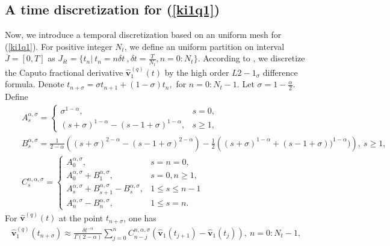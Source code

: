 \documentclass[9pt]{article}
\numberwithin{equation}{section}
\begin{document}
 \subsection{ A time discretization for (\ref{ki1q1}) } Now, we introduce a temporal discretization based on an uniform mesh for (\ref{ki1q1}). For positive integer $N_t$, we define an uniform partition on interval $\overline{J}=[0,T]$ as
$J_{\delta t} =\{ t_{n}|~ t_{n}=n \delta t~,\delta t= \frac{T}{N_t} ,n=0:N_t\}$. According to \cite{alikhonov}, we discretize the Caputo fractional derivative $  \widehat{\textbf{v}}_{1}^{(q)}(t)$ by the high order $L2-1_{\sigma}$ difference formula. Denote $t_{n+\sigma}=\sigma t_{n+1}+(1-\sigma)t_n,$ for $n=0:N_t-1$. 
Let $\sigma=1-\frac{\alpha}{2}$. Define
 \begin{eqnarray*}
 &&A_{s}^{\alpha,\sigma}=\left\{
                         \begin{array}{ll}
                           \sigma^{1-\alpha}, & s=0,\\
                           (s+\sigma)^{1-\alpha}-(s-1+\sigma)^{1-\alpha}, & s\geq1,
                         \end{array}
                       \right.\\
&&B_{s}^{\alpha,\sigma}=\frac{1}{2-\alpha}\left((s+\sigma)^{2-\alpha}-(s-1+\sigma)^{2-\alpha}\right)-\frac{1}{2}\left((s+\sigma)^{1-\alpha}+(s-1+\sigma))^{1-\alpha})\right),~s\geq1,\\
&&C_{s}^{n,\alpha,\sigma}=\left\{
                            \begin{array}{ll}
                              A_{0}^{\alpha,\sigma}, & s=n=0, \\
                               A_{0}^{\alpha,\sigma}+ B_{1}^{\alpha,\sigma}, & s=0,n\geq1, \\
                               A_{s}^{\alpha,\sigma}+ B_{s+1}^{\alpha,\sigma}-B_{s}^{\alpha,\sigma}, & 1 \leq s\leq n-1\\
                              A_{n}^{\alpha,\sigma}-B_{n}^{\alpha,\sigma}, & 1\leq s=n.
                            \end{array}
                          \right.
 \end{eqnarray*}
 For  $ \widehat{\textbf{v}}^{(q)}(t)$ at the point $t_{n+\sigma}$, one has
\begin{eqnarray}\label{9}
\widehat{\textbf{v}}_1^{(q)}(t_{n+\sigma})\approx \frac{\delta t^{-\alpha}}{\Gamma(2-\alpha)}\sum_{j=0}^{n}C_{n-j}^{n,\alpha,\sigma}(\widehat{\textbf{v}}_1(t_{j+1})-\widehat{\textbf{v}}_1(t_{j})),~n=0:N_t-1,
\end{eqnarray}
\end{document}
